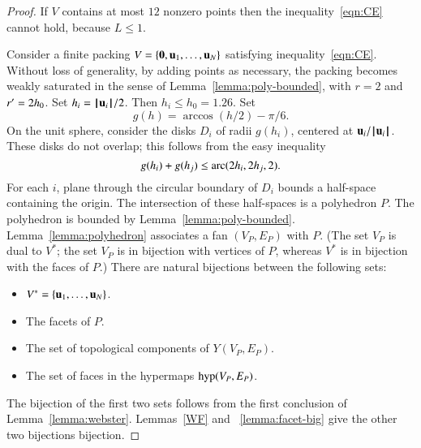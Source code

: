 \begin{proof} If $ V$ contains at most $12$ nonzero points then
the inequality~\ref{eqn:CE} cannot hold, because $L\le 1$.

Consider a finite packing $ V=\{{\mathbf 0}, {\mathbf u}_1,\ldots, {\mathbf u}_N\}$ satisfying inequality~\ref{eqn:CE}.   Without loss of generality, by adding points as necessary, the packing becomes weakly saturated in the sense of Lemma~\ref{lemma:poly-bounded}, with $r=2$ and $r'=2{h_0}$.  Set $h_i = {{\hskip0.1em|\hskip-0.15em|\hskip0.1em} {\mathbf u}_i{\hskip0.1em|\hskip-0.15em|\hskip0.1em}}/2$.  Then $h_i\le h_0=1.26$.  Set
$$
g(h) = \arccos(h/2) - \pi/6.
$$
On the unit sphere,  consider the disks $D_i$ of radii $g(h_i)$, centered at $ {\mathbf u}_i/{{\hskip0.1em|\hskip-0.15em|\hskip0.1em} {\mathbf u}_i{\hskip0.1em|\hskip-0.15em|\hskip0.1em}}$.  These disks do not overlap; this follows from the easy inequality~\cite[]{hales:2009:nonlinear} %
$$
g(h_i) + g(h_j) \le {\operatorname{arc}}(2h_i,2h_j,2).
$$
%
For each $i$, plane through the circular boundary of $D_i$ bounds a half-space containing the origin.  The intersection of these half-spaces is a polyhedron $P$.  The polyhedron is bounded by Lemma~\ref{lemma:poly-bounded}.   Lemma~\ref{lemma:polyhedron} associates a fan $(V_P,E_P)$ with $P$.    (The set $V_P$ is dual to $ V^*$; the set $V_P$ is in bijection with vertices of $P$, whereas $ V^*$ is in bijection with the faces of $P$.)  There are natural bijections between the following sets:
\begin{itemize}
\item $ V^* = \{ {\mathbf u}_1,\ldots, {\mathbf u}_N\}$.
\item The  facets of $P$.
\item The set of  topological components of $Y(V_P,E_P)$.
\item The set of faces in the hypermaps ${\operatorname{hyp}}(V_P,E_P)$.
\end{itemize}
The bijection of the first two sets follows from the first conclusion of Lemma~\ref{lemma:webster}.
Lemmas~\ref{WF} and ~\ref{lemma:facet-big} give the other two bijections bijection.


\end{proof}
